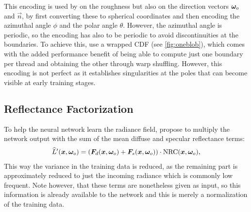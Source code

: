 This encoding is used by \textcite{muller2021} on the roughness but also on the direction vectors ${\bm{\omega}_o}$ and $\vec{n}$, by first converting these to spherical coordinates and then encoding the azimuthal angle $\phi$ and the polar angle $\theta$.
However, the azimuthal angle is periodic, so the encoding has also to be periodic to avoid discontinuities at the boundaries.
To achieve this, \textcite{muller2021} use a wrapped CDF (see \cref{fig:oneblob}), which comes with the added performance benefit of being able to compute just one boundary per thread and obtaining the other through warp shuffling.
However, this encoding is not perfect as it establishes singularities at the poles that can become visible at early training stages.




\subsection{Reflectance Factorization}
To help the neural network learn the radiance field, \textcite{muller2021} propose to multiply the network output with the sum of the mean diffuse and specular reflectance terms:
\begin{equation}
    \widehat{L}'(\vec{x}, \wo) = \left( \vec{F}_d(\vec{x}, \wo) + \vec{F}_s(\vec{x}, \wo) \right) \cdot \mathrm{NRC}(\vec{x}, \wo),
\end{equation}
This way the variance in the training data is reduced, as the remaining part is approximately reduced to just the incoming radiance which is commonly low frequent.
Note however, that these terms are nonetheless given as input, so this information is already available to the network and this is merely a normalization of the training data.

